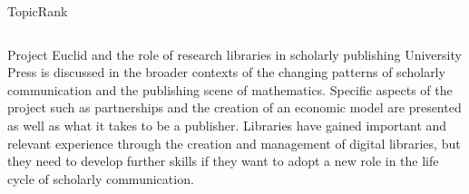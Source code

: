 \begin{frame}[label=topicrank]{TopicRank}
\begin{columns}
\begin{column}{.55\textwidth}
{\begin{exampleblock}{\footnotesize Project Euclid and the role of
                                 research libraries in scholarly publishing}
              University Press is discussed in the broader contexts of the
              changing patterns of scholarly communication and the publishing
              scene of mathematics. Specific aspects of the project such as
              partnerships and the creation of an economic model are presented
              as well as what it takes to be a publisher. Libraries have gained
              important and relevant experience through the creation and
              management of digital libraries, but they need to develop further
              skills if they want to adopt a new role in the life cycle of
              scholarly communication.
            \end{exampleblock}
          }
        \endminipage
      \end{column}
    \end{columns}
  \end{frame}

